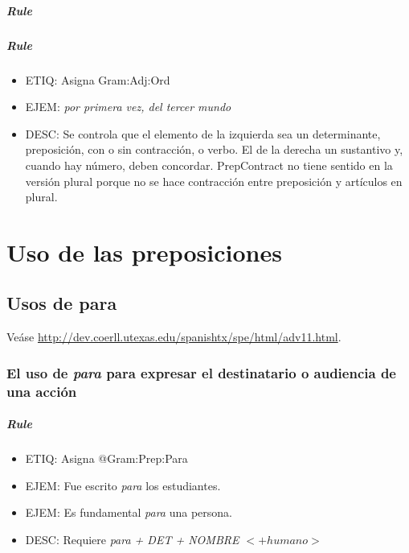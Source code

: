 \documentclass[11pt]{report}
\begin{document}
\paragraph*{Rule}
\paragraph*{Rule}
\begin{itemize}
\item ETIQ: Asigna Gram:Adj:Ord
\item EJEM: \emph{por primera vez, del tercer mundo} 
\item DESC: Se controla que el elemento de la izquierda sea un determinante, preposición, con o sin contracción, o verbo. El de la derecha un sustantivo y, cuando hay número, deben concordar. PrepContract no tiene sentido en la versión plural porque no se hace contracción entre preposición y artículos en plural.
\end{itemize}

\chapter{Uso de las preposiciones}
\section{Usos de para}
Veáse \url{http://dev.coerll.utexas.edu/spanishtx/spe/html/adv11.html}.

\subsection{El uso de \emph{para} para expresar el destinatario o audiencia de una acción}
\paragraph*{Rule}
\begin{itemize}
\item ETIQ: Asigna @Gram:Prep:Para
\item EJEM: Fue escrito \emph{para} los estudiantes.
\item EJEM: Es fundamental \emph{para} una persona.
\item DESC: Requiere \emph{para + DET + NOMBRE $<+humano>$}
\end{itemize}
\end{document}
